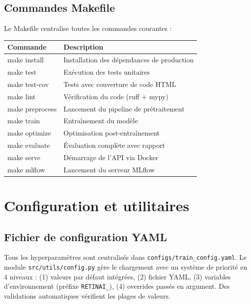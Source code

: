 \documentclass[11pt,a4paper]{article}
\begin{document}
\subsection{Commandes Makefile}

Le Makefile centralise toutes les commandes courantes :

\begin{center}
\renewcommand{\arraystretch}{1.3}
\begin{tabularx}{\textwidth}{>{\ttfamily}lX}
\toprule
\normalfont\textbf{Commande} & \textbf{Description} \\
\midrule
make install & Installation des dépendances de production \\
make test & Exécution des tests unitaires \\
make test-cov & Tests avec couverture de code HTML \\
make lint & Vérification du code (ruff + mypy) \\
make preprocess & Lancement du pipeline de prétraitement \\
make train & Entraînement du modèle \\
make optimize & Optimisation post-entraînement \\
make evaluate & Évaluation complète avec rapport \\
make serve & Démarrage de l'API via Docker \\
make mlflow & Lancement du serveur MLflow \\
\bottomrule
\end{tabularx}
\end{center}

\section{Configuration et utilitaires}

\subsection{Fichier de configuration YAML}

Tous les hyperparamètres sont centralisés dans \texttt{configs/train\_config.yaml}. Le module \texttt{src/utils/config.py} gère le chargement avec un système de priorité en 4 niveaux : (1) valeurs par défaut intégrées, (2) fichier YAML, (3) variables d'environnement (préfixe \texttt{RETINAI\_}), (4) overrides passés en argument. Des validations automatiques vérifient les plages de valeurs.
\end{document}
